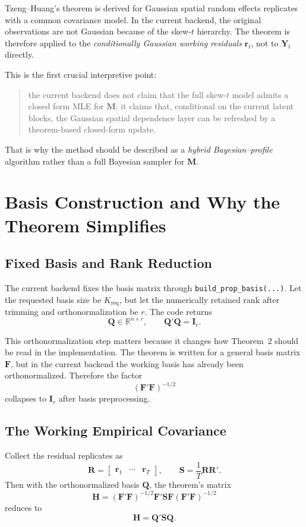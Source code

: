 \documentclass[11pt]{article}
\newcommand{\bY}{\mathbf{Y}}
\newcommand{\bF}{\mathbf{F}}
\newcommand{\bQ}{\mathbf{Q}}
\newcommand{\bM}{\mathbf{M}}
\newcommand{\bS}{\mathbf{S}}
\newcommand{\bH}{\mathbf{H}}
\newcommand{\br}{\mathbf{r}}
\newcommand{\I}{\mathbf{I}}
\begin{document}
Tzeng--Huang's theorem is derived for Gaussian spatial random effects
replicates with a common covariance model. In the current backend, the original
observations are not Gaussian because of the skew-$t$ hierarchy. The theorem is
therefore applied to the \emph{conditionally Gaussian working residuals}
\(\br_t\), not to \(\bY_t\) directly.

This is the first crucial interpretive point:

\begin{quote}
the current backend does not claim that the full skew-$t$ model admits a closed
form MLE for $\bM$; it claims that, conditional on the current latent blocks,
the Gaussian spatial dependence layer can be refreshed by a theorem-based
closed-form update.
\end{quote}

That is why the method should be described as a \emph{hybrid
Bayesian--profile} algorithm rather than a full Bayesian sampler for
$\bM$.

\section{Basis Construction and Why the Theorem Simplifies}

\subsection{Fixed Basis and Rank Reduction}

The current backend fixes the basis matrix through
\texttt{build\_prop\_basis(...)}. Let the requested basis size be
\(K_{\mathrm{req}}\), but let the numerically retained rank after trimming and
orthonormalization be \(r\). The code returns
\[
\bQ \in \mathbb{R}^{n \times r},
\qquad
\bQ' \bQ = \I_r.
\]

This orthonormalization step matters because it changes how Theorem~2 should be
read in the implementation. The theorem is written for a general basis matrix
\(\bF\), but in the current backend the working basis has already been
orthonormalized. Therefore the factor
\[
(\bF' \bF)^{-1/2}
\]
collapses to \(\I_r\) after basis preprocessing.

\subsection{The Working Empirical Covariance}

Collect the residual replicates as
\[
\mathbf{R}
=
\begin{bmatrix}
\br_1 & \cdots & \br_T
\end{bmatrix},
\qquad
\bS = \frac{1}{T} \mathbf{R} \mathbf{R}'.
\]
Then with the orthonormalized basis \(\bQ\), the theorem's matrix
\[
\bH
=
(\bF'\bF)^{-1/2}\bF' \bS \bF (\bF'\bF)^{-1/2}
\]
reduces to
\begin{equation}
\bH = \bQ' \bS \bQ.
\label{eq:h-simplified}
\end{equation}
\end{document}
